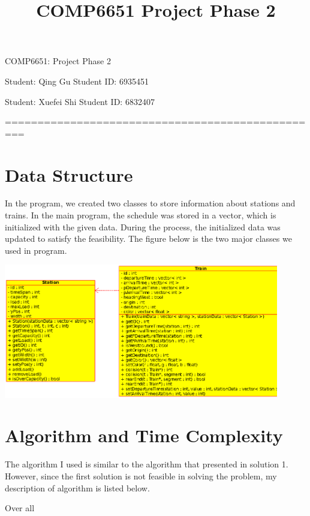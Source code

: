 \documentclass[letterpaper, 12pt, titlepage]{article}
\begin{document}
\title{COMP6651 Project Phase 2}
\setcounter{tocdepth}{2}
\newpage
\begin{center}
    {\huge COMP6651: Project Phase 2}


    \vspace{2cm}
    Student: Qing Gu  \hspace{5cm}
    Student ID: 6935451
   
    Student: Xuefei Shi  \hspace{5cm}
    Student ID: 6832407
\vspace{1cm}
    \vspace{1cm}

    =================================================
\end{center}

\section{Data Structure}
In the program, we created two classes to store information about stations and trains. In the main program, the schedule was stored in a vector, which is initialized with the given data. During the process, the initialized data was updated to satisfy the feasibility. The figure below is the two major classes we used in program.
\begin{center}
    \small
    \centering
    \includegraphics[width=12cm]{class.ps}
    \label{uml}
\end{center} \section{Algorithm and Time Complexity}
The algorithm I used is similar to the algorithm that presented in solution 1. However, since the first solution is not feasible in solving the problem, my description of algorithm is listed below.
\begin{algorithm}
    \begin{algorithmic}
                    
            \Else
                    
            \EndIf
        \EndWhile
    \EndFor
    \end{algorithmic}
    \caption{Over all}
    \label{algo}
\end{algorithm}
\end{document}
